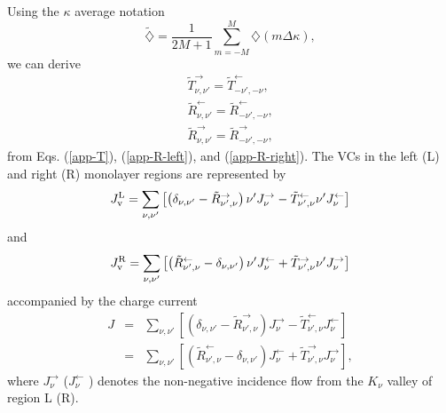 \documentclass{jpsj3}
\begin{document}
Using the $\kappa$ average notation 
\begin{equation} 
\tilde{\diamondsuit}=\frac{1}{2M+1}\sum_{m=-M}^M \diamondsuit(m\Delta \kappa),
\end{equation}
we can derive
\begin{eqnarray} 
\tilde{T}^{\rightarrow}_{\nu,\nu'}=\tilde{T}^{\leftarrow}_{-\nu',-\nu},
\label{app-T-2}
\\
\tilde{R}^{\leftarrow}_{\nu,\nu'}=\tilde{R}^{\leftarrow}_{-\nu',-\nu},
\label{app-R-left-2}\\
\tilde{R}^{\rightarrow}_{\nu,\nu'}=\tilde{R}^{\rightarrow}_{-\nu',-\nu}, 
\label{app-R-right-2}
\end{eqnarray}
from Eqs. (\ref{app-T}), (\ref{app-R-left}), and (\ref{app-R-right}).
The VCs in the left (L) and right (R) monolayer regions are
represented by
\begin{equation}
J_{\rm v}^{\rm L}=\sum_{\nu,\nu'}\left[
\left(
\delta_{\nu,\nu'}-\tilde{R}_{\nu',\nu}^{\rightarrow}
\right)\nu'J_\nu^{\rightarrow}
-\tilde{T}_{\nu',\nu}^{\leftarrow}\nu'J_\nu^{\leftarrow}
\right]
\label{Jv-L}
\end{equation}
and
\begin{equation}
J_{\rm v}^{\rm R}=\sum_{\nu,\nu'}\left[
\left(
\tilde{R}_{\nu',\nu}^{\leftarrow}-\delta_{\nu,\nu'}
\right)\nu'J_\nu^{\leftarrow}
+\tilde{T}_{\nu',\nu}^{\rightarrow}\nu'J_\nu^{\rightarrow}
\right]
\label{Jv-R}
\end{equation}
accompanied by the charge current
\begin{eqnarray}
J &=& \sum_{\nu,\nu'}\left[
\left(
\delta_{\nu,\nu'}-\tilde{R}_{\nu',\nu}^{\rightarrow}
\right)J_\nu^{\rightarrow}
-\tilde{T}_{\nu',\nu}^{\leftarrow}J_\nu^{\leftarrow}
\right] \\
&=& 
\sum_{\nu,\nu'}\left[
\left(
\tilde{R}_{\nu',\nu}^{\leftarrow}-\delta_{\nu,\nu'}
\right)J_\nu^{\leftarrow}
+\tilde{T}_{\nu',\nu}^{\rightarrow}J_\nu^{\rightarrow}
\right],
\label{app-J}
\end{eqnarray}
where $J_\nu^{\rightarrow}$ ($J_\nu^{\leftarrow}$ ) 
denotes the non-negative incidence flow from the $K_\nu$ valley of region L (R).
\end{document}
